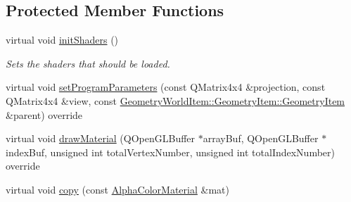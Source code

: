 \subsection*{Protected Member Functions}
\begin{DoxyCompactItemize}
\item 
\mbox{\label{class_geometry_engine_1_1_geometry_material_1_1_alpha_color_material_ab4427c9fedf108fbb5aa88c4aaa6c384}} 
virtual void \mbox{\hyperlink{class_geometry_engine_1_1_geometry_material_1_1_alpha_color_material_ab4427c9fedf108fbb5aa88c4aaa6c384}{init\+Shaders}} ()
\begin{DoxyCompactList}\small\item\em Sets the shaders that should be loaded. \end{DoxyCompactList}\item 
virtual void \mbox{\hyperlink{class_geometry_engine_1_1_geometry_material_1_1_alpha_color_material_ab1fdac9dfbf26f3f712c345845ef9983}{set\+Program\+Parameters}} (const Q\+Matrix4x4 \&projection, const Q\+Matrix4x4 \&view, const \mbox{\hyperlink{class_geometry_engine_1_1_geometry_world_item_1_1_geometry_item_1_1_geometry_item}{Geometry\+World\+Item\+::\+Geometry\+Item\+::\+Geometry\+Item}} \&parent) override
\item 
virtual void \mbox{\hyperlink{class_geometry_engine_1_1_geometry_material_1_1_alpha_color_material_a2c0f093001db90b50e42b0520c48f7d1}{draw\+Material}} (Q\+Open\+G\+L\+Buffer $\ast$array\+Buf, Q\+Open\+G\+L\+Buffer $\ast$index\+Buf, unsigned int total\+Vertex\+Number, unsigned int total\+Index\+Number) override
\item 
virtual void \mbox{\hyperlink{class_geometry_engine_1_1_geometry_material_1_1_alpha_color_material_a59728843668ee81b42a908d143a23754}{copy}} (const \mbox{\hyperlink{class_geometry_engine_1_1_geometry_material_1_1_alpha_color_material}{Alpha\+Color\+Material}} \&mat)
\end{DoxyCompactItemize}
